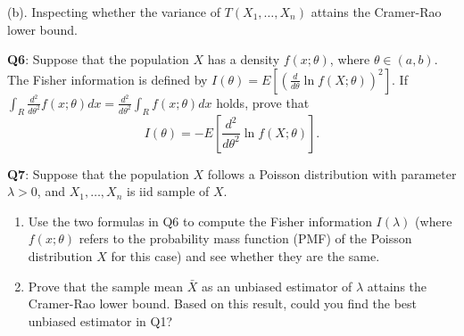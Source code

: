 \documentclass[]{article}
\begin{document}
(b). Inspecting whether the variance of \(T(X_1,\dots,X_n)\) attains the
Cramer-Rao lower bound.

\textbf{Q6}: Suppose that the population \(X\) has a density
\(f(x;\theta)\), where \(\theta\in (a,b)\). The Fisher information is
defined by \(I(\theta) = E[(\frac{d}{d\theta}\ln f(X;\theta))^2]\). If
\(\int_R\frac{d^2}{d\theta^2} f(x;\theta)d x = \frac{d^2}{d\theta^2}\int_R f(x;\theta)d x\)
holds, prove that
\[I(\theta)= -E\left[\frac{d^2}{d\theta^2} \ln f(X;\theta)\right].\]

\textbf{Q7}: Suppose that the population \(X\) follows a Poisson
distribution with parameter \(\lambda>0\), and \(X_1,\dots, X_n\) is iid
sample of \(X\).

\begin{enumerate}
\def\labelenumi{\arabic{enumi}.}
\item
  Use the two formulas in Q6 to compute the Fisher information
  \(I(\lambda)\) (where \(f(x;\theta)\) refers to the probability mass
  function (PMF) of the Poisson distribution \(X\) for this case) and
  see whether they are the same.
\item
  Prove that the sample mean \(\bar X\) as an unbiased estimator of
  \(\lambda\) attains the Cramer-Rao lower bound. Based on this result,
  could you find the best unbiased estimator in Q1?
\end{enumerate}
\end{document}
